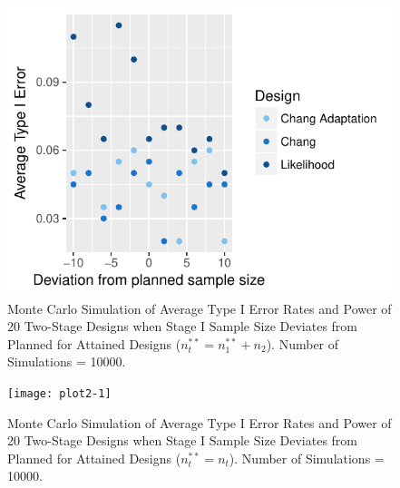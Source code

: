 \documentclass[12pt]{report}\usepackage[]{graphicx}\usepackage[]{color}
\newlength{\li}\setlength{\li}{14.48pt}
\begin{document}
% 
\begin{landscape}
\begin{figure}[]
\caption{Monte Carlo Simulation of Average Type I Error Rates and Power of 20 Two-Stage Designs when Stage I Sample Size Deviates from Planned for Attained Designs ($n_t^{\ast\ast} = n_1^{\ast\ast} + n_2$). Number of Simulations = 10000.}
\centering
\begin{Schunk}


\centerline{\includegraphics{plot1-1} }

\end{Schunk}
\end{figure}
\end{landscape}


\begin{landscape}
\begin{figure}[]
\caption{Monte Carlo Simulation of Average Type I Error Rates and Power of 20 Two-Stage Designs when Stage I Sample Size Deviates from Planned for Attained Designs ($n_t^{\ast\ast} = n_t$). Number of Simulations = 10000.}
\begin{Schunk}


\centerline{\texttt{[image: plot2-1]} }

\end{Schunk}
\end{figure}
\end{landscape}
\end{document}
